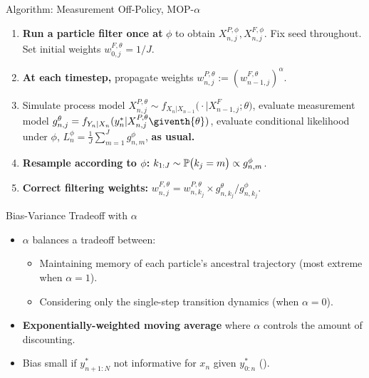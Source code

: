 \documentclass{beamer}
\begin{document}
\begin{frame}{Algorithm: Measurement Off-Policy, MOP-$\alpha$}
    \begin{enumerate}
        \item \textbf{Run a particle filter once at} $\phi$ to obtain $X_{n,j}^{P,\phi}, X_{n,j}^{F,\phi}$. Fix seed throughout. Set initial weights $w_{0,j}^{F,\theta} = 1/J$.
        \item \pause \textbf{At each timestep,} propagate weights $w_{n,j}^{P,\theta} := (w_{n-1,j}^{F,\theta})^\alpha$. 
        \item \pause Simulate process model ${X}_{n,j}^{P,\theta}\sim {f}_{{X}_{n}|{X}_{n-1}}\big(\cdot|{X}_{n-1,j}^{F};{\theta}\big)$, evaluate measurement model $g^{\theta}_{n,j}={f}_{{Y}_{n}|{X}_{n}}(y_{n}^{*}|{X}_{n,j}^{P,\theta}\giventh{\theta})$, evaluate conditional likelihood under $\phi$, $L_n^{\phi} = \frac{1}{J}\sum_{m=1}^{J}g^{\phi}_{n,m}$, \textbf{as usual.}
        \item \pause \textbf{Resample according to $\phi$:} $k_{1:J} \sim \mathbb{P}\big(k_{j}=m\big) \propto g^{\phi}_{n,m}$.
        \item \pause \textbf{Correct filtering weights:} $\displaystyle w^{F,\theta}_{n,j}= w^{P,\theta}_{n,k_j} \times  g^{\theta}_{n,k_j}/ g^{\phi}_{n,k_j}$. 
    \end{enumerate}
    \pause 
\end{frame}


\begin{frame}{Bias-Variance Tradeoff with $\alpha$}
\begin{itemize}
    \item $\alpha$ balances a tradeoff between:
    \begin{itemize}
        \item \pause Maintaining memory of each particle's ancestral trajectory (most extreme when $\alpha=1$).
        \item \pause Considering only the single-step transition dynamics (when $\alpha=0$).
    \end{itemize}
    \item \pause\textbf{Exponentially-weighted moving average} where $\alpha$ controls the amount of discounting.
    \item \pause Bias small if $y_{n+1:N}^*$ not informative for $x_n$ given $y_{0:n}^*$ (\cite{corenflos21}).
\end{itemize}
    
\end{frame}
\end{document}
